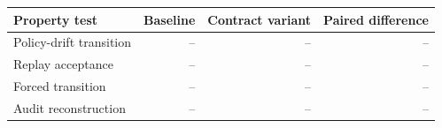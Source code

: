 \begin{tabular}{lrrr}
\toprule
Property test & Baseline & Contract variant & Paired difference \\
\midrule
Policy-drift transition & -- & -- & -- \\
Replay acceptance & -- & -- & -- \\
Forced transition & -- & -- & -- \\
Audit reconstruction & -- & -- & -- \\
\bottomrule
\end{tabular}
